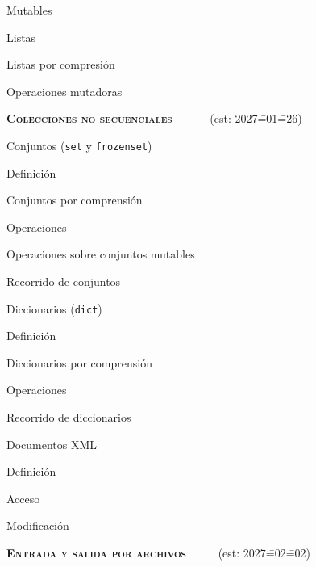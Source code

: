 \begin{longenum}
\begin{longenum}
\begin{longenum}
        \end{longenum}
        \item Mutables
        \begin{longenum}
            \item Listas
            \begin{longenum}
                \item Listas por compresión
            \end{longenum}
            \item Operaciones mutadoras
        \end{longenum}
    \end{longenum}
    \item \textbf{\textsc{Colecciones no secuenciales}} \ \ \ \ \ \ (est: 2027\==01\==26)
    \begin{longenum}
        \item Conjuntos (\texttt{set} y \texttt{frozenset})
        \begin{longenum}
            \item Definición
            \item Conjuntos por comprensión
            \item Operaciones
            \item Operaciones sobre conjuntos mutables
            \item Recorrido de conjuntos
        \end{longenum}
        \item Diccionarios (\texttt{dict})
        \begin{longenum}
            \item Definición
            \item Diccionarios por comprensión
            \item Operaciones
            \item Recorrido de diccionarios
        \end{longenum}
        \item Documentos XML
        \begin{longenum}
            \item Definición
            \item Acceso
            \item Modificación
        \end{longenum}
    \end{longenum}
    \item \textbf{\textsc{Entrada y salida por archivos}} \ \ \ \ \ (est: 2027\==02\==02)

\end{longenum}
